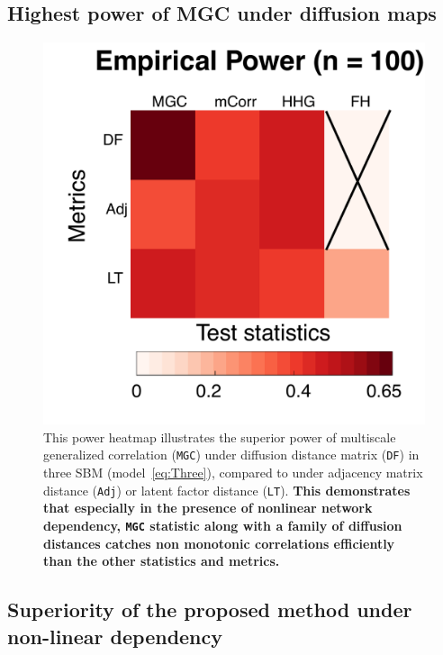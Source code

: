 \documentclass[12pt]{article}
\begin{document}
\subsection*{Highest power of MGC under diffusion maps}

\begin{figure}
	\centering
	\includegraphics[width=0.4\paperwidth, height=0.4\paperwidth]{../../Figure/ThreeSBM_results_simple.pdf}
	\caption{This power heatmap illustrates the superior power of multiscale generalized correlation (\texttt{MGC}) under diffusion distance matrix (\texttt{DF}) in three SBM (model~\ref{eq:Three}), compared to under adjacency matrix distance (\texttt{Adj}) or latent factor distance (\texttt{LT}). \textbf{This demonstrates that especially in the presence of nonlinear network dependency, \texttt{MGC} statistic along with a family of diffusion distances catches non monotonic correlations efficiently than the other statistics and metrics.}}
	\label{fig:threeSBM}
\end{figure}

\subsection*{Superiority of the proposed method under non-linear dependency}
\end{document}
